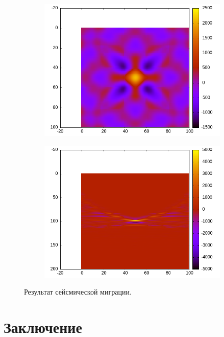 \documentclass[a4paper, fontsize=14pt]{article}
\begin{document}
	\begin{figure}[h]
		\begin{subfigure}{0.5\textwidth}
			\includegraphics[width=\textwidth]{migflatxyt1.png}
		\end{subfigure}
		\begin{subfigure}{0.5\textwidth}
			\includegraphics[width=\textwidth]{migflatxzy0.5.png}
		\end{subfigure}
		\caption{Результат сейсмической миграции.}
	\end{figure}
	
	
	\clearpage
	
	
	\section*{Заключение} 
	
	\newpage
	
	
	\printbibliography
	
	\newpage
	
	
\end{document}
